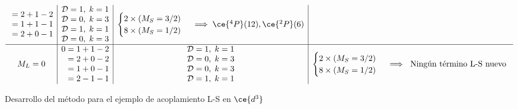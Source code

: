 \begin{figure}[H]
\begin{center}
\begin{align*}
\begin{array}{c | c | c | c}
\begin{aligned}
       &= 2 + 1 - 2\\ 
       &= 1 + 1 - 1\\ 
       &= 2 + 0 - 1
   \end{aligned} & 
   \begin{aligned}
      \mathcal{D} &= 1,\; k = 1\\ 
      \mathcal{D} &= 0,\; k = 3\\ 
      \mathcal{D} &= 1,\; k = 1\\ 
      \mathcal{D} &= 0,\; k = 3\\ 
    \end{aligned} & 
    \begin{cases}
    2 \times (M_{S} = 3/2)\\
    8 \times (M_{S} = 1/2) 
    \end{cases} \implies  \ce{^{4}P}(12), \ce{^{2}P}(6)\\
 \hline 
     M_{L} = 0 & 
     \begin{aligned}
     0 &= 1 + 1 - 2\\ 
       &= 2 + 0 - 2\\ 
       &= 1 + 0 - 1\\ 
       &= 2 -1 - 1
   \end{aligned} & 
   \begin{aligned}
      \mathcal{D} &= 1,\; k = 1\\ 
      \mathcal{D} &= 0,\; k = 3\\ 
      \mathcal{D} &= 0,\; k = 3\\ 
      \mathcal{D} &= 1,\; k = 1\\ 
    \end{aligned} & 
    \begin{cases}
    2 \times (M_{S} = 3/2)\\
    8 \times (M_{S} = 1/2) 
    \end{cases} \implies  \text{ Ningún término L-S nuevo }\\
 \end{array}
\end{align*}
  \end{center}
  \caption{Desarrollo del método para el ejemplo de acoplamiento L-S en $\ce{d^{3}}$ }\label{fig:ejemplo3e}
\end{figure}



